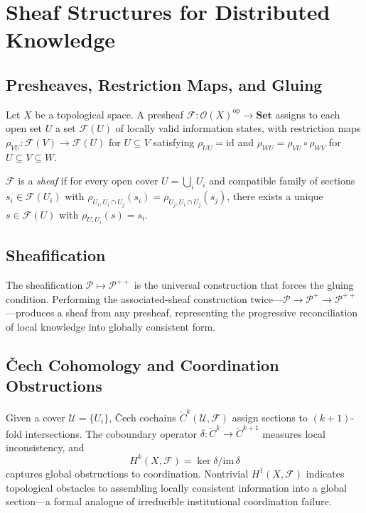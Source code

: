 \documentclass[12pt]{article}
\begin{document}
\section{Sheaf Structures for Distributed Knowledge}
\label{app:sheaf}

\subsection{Presheaves, Restriction Maps, and Gluing}

Let $X$ be a topological space. A presheaf $\mathcal{F} : \mathcal{O}(X)^{\mathrm{op}} \to \mathbf{Set}$ assigns to each open set $U$ a set $\mathcal{F}(U)$ of locally valid information states, with restriction maps $\rho_{VU} : \mathcal{F}(V) \to \mathcal{F}(U)$ for $U \subseteq V$ satisfying $\rho_{UU} = \mathrm{id}$ and $\rho_{WU} = \rho_{VU} \circ \rho_{WV}$ for $U \subseteq V \subseteq W$.

$\mathcal{F}$ is a \emph{sheaf} if for every open cover $U = \bigcup_i U_i$ and compatible family of sections $s_i \in \mathcal{F}(U_i)$ with $\rho_{U_i, U_i \cap U_j}(s_i) = \rho_{U_j, U_i \cap U_j}(s_j)$, there exists a unique $s \in \mathcal{F}(U)$ with $\rho_{U,U_i}(s) = s_i$.

\subsection{Sheafification}

The sheafification $\mathcal{P} \mapsto \mathcal{P}^{++}$ is the universal construction that forces the gluing condition. Performing the associated-sheaf construction twice---$\mathcal{P} \to \mathcal{P}^+ \to \mathcal{P}^{++}$---produces a sheaf from any presheaf, representing the progressive reconciliation of local knowledge into globally consistent form.

\subsection{Čech Cohomology and Coordination Obstructions}

Given a cover $\mathcal{U} = \{U_i\}$, Čech cochains $\check{C}^k(\mathcal{U},\mathcal{F})$ assign sections to $(k+1)$-fold intersections. The coboundary operator $\delta : \check{C}^k \to \check{C}^{k+1}$ measures local inconsistency, and
\[
H^k(X,\mathcal{F}) = \ker\delta / \mathrm{im}\,\delta
\]
captures global obstructions to coordination. Nontrivial $H^1(X,\mathcal{F})$ indicates topological obstacles to assembling locally consistent information into a global section---a formal analogue of irreducible institutional coordination failure.
\end{document}
